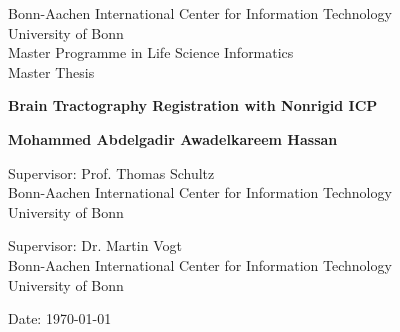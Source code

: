 \documentclass[../structure.tex]{subfiles}
\begin{document}
\begin{titlepage}
\begin{center}
		\vspace*{1cm}
        
        Bonn-Aachen International Center for Information Technology\\
        University of Bonn\\
        Master Programme in Life Science Informatics \\
        Master Thesis \\
        
        \vspace{2cm}
        
        \fontsize{18pt}{20pt}\selectfont
        \textbf{Brain Tractography Registration with Nonrigid ICP}
        
        \vspace{2cm}
        
        \fontsize{14pt}{20pt}\selectfont
        \textbf{Mohammed Abdelgadir Awadelkareem Hassan}
        
        \vspace{1.5cm}
        
        
        \vspace{0.2cm}
        Supervisor: Prof. Thomas Schultz \\Bonn-Aachen International Center for Information Technology \\University of Bonn
        
        \vspace{0.7cm}
        Supervisor: Dr. Martin Vogt \\Bonn-Aachen International Center for Information Technology \\University of Bonn
        
        
        \vspace{2cm}
        
        
        Date: \today
       
        \vspace{0.8cm}
    \end{center}
\end{titlepage}
\end{document}
